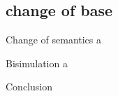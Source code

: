 \documentclass{beamer}
\begin{document}
\subsection{change of base}
\begin{frame}{Change of semantics}
  a
\end{frame}
\begin{frame}{Bisimulation}
  a
\end{frame}

\begin{frame}{Conclusion}

\end{frame}
\end{document}
